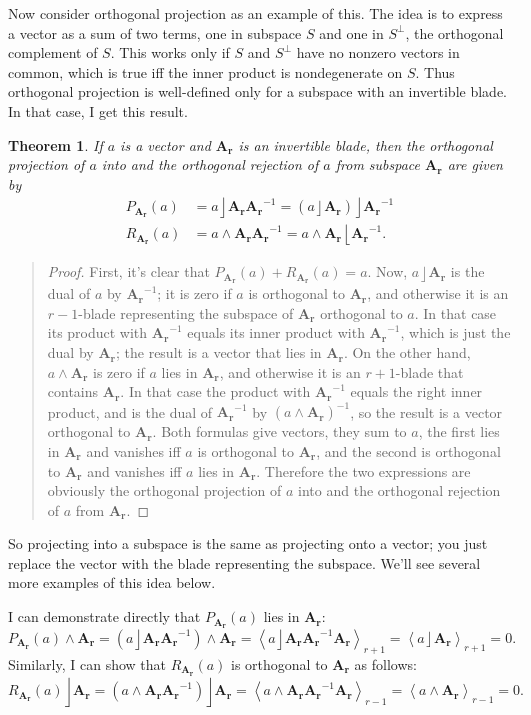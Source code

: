 \documentclass{utarticle}
\newcommand{\bl}[1]{\ensuremath{\bm{#1}}}
\DeclareMathOperator{\lin}{\rfloor}
\DeclareMathOperator{\rin}{\lfloor}
\DeclareMathOperator{\out}{\wedge}
\newcommand{\grade}[2][]{\ensuremath{\left\langle #2 \right\rangle_{#1}}}
\newtheorem{thm}{Theorem}
\newcommand{\bp}{\begin{quotation} \begin{proof}}
\newcommand{\ep}{\end{proof} \end{quotation}}
\begin{document}
Now consider orthogonal projection as an example of this.  The idea is
to express a vector as a sum of two terms, one in subspace $S$ and one
in $S^\perp$, the orthogonal complement of $S$.  This works only if
$S$ and $S^\perp$ have no nonzero vectors in common, which is true iff
the inner product is nondegenerate on $S$.  Thus orthogonal projection
is well-defined only for a subspace with an invertible
blade.  In that case, I get this result.
\begin{thm}
If $a$ is a vector and \bl{A_r} is an invertible blade, then the orthogonal projection 
of $a$ into and the orthogonal rejection of $a$ from subspace \bl{A_r} are given
by
\begin{align} 
P_{\bl{A_r}}(a) & = a \lin \bl{A_r} \bl{A_r}^{-1} = (a \lin \bl{A_r}) \lin \bl{A_r}^{-1} \nonumber \\
R_{\bl{A_r}}(a) & = a \out \bl{A_r} \bl{A_r}^{-1} = a \out \bl{A_r} \rin \bl{A_r}^{-1}.
\end{align}
\label{vectorprojrej}
\end{thm}
\bp
First, it's clear that $P_{\bl{A_r}}(a) + R_{\bl{A_r}}(a) = a$.  Now, 
$a \lin \bl{A_r}$ is the dual of $a$ by $\bl{A_r}^{-1}$; it is zero 
if $a$ is orthogonal to \bl{A_r}, and otherwise it is an $r-1$-blade 
representing the subspace of \bl{A_r} orthogonal to $a$.  In that case 
its product with $\bl{A_r}^{-1}$ equals its inner product with $\bl{A_r}^{-1}$, 
which is just the dual by \bl{A_r}; the result is a vector that lies 
in \bl{A_r}.   On the other hand, $a \out \bl{A_r}$ is 
zero if $a$ lies in \bl{A_r}, and otherwise it is an $r+1$-blade 
that contains \bl{A_r}.  In that case the product with $\bl{A_r}^{-1}$ 
equals the right inner product, and is the dual of $\bl{A_r}^{-1}$ by $(a \out \bl{A_r})^{-1}$, 
so the result is a vector orthogonal to \bl{A_r}.  Both formulas give vectors, 
they sum to $a$, the first lies in \bl{A_r} and vanishes iff $a$ is orthogonal to \bl{A_r}, 
and the second is orthogonal to \bl{A_r} and vanishes iff $a$ lies in \bl{A_r}.
Therefore the two expressions are obviously the 
orthogonal projection of $a$ into and the orthogonal rejection of $a$ 
from \bl{A_r}.
\ep

So projecting into a subspace is the same as projecting onto a vector; you just replace 
the vector with the blade representing the subspace.  We'll see several more examples 
of this idea below.

I can demonstrate directly that $P_{\bl{A_r}}(a)$ lies in \bl{A_r}:
\begin{equation}
P_{\bl{A_r}}(a) \out \bl{A_r} = (a \lin \bl{A_r} \bl{A_r}^{-1}) \out \bl{A_r} = 
\grade[r+1]{a \lin \bl{A_r} \bl{A_r}^{-1} \bl{A_r}} =  \grade[r+1]{a \lin \bl{A_r}} = 0.
\end{equation}
Similarly, I can show that $R_{\bl{A_r}}(a)$ is orthogonal to \bl{A_r} as follows:
\begin{equation}
R_{\bl{A_r}}(a) \lin \bl{A_r} = (a \out \bl{A_r} \bl{A_r}^{-1}) \lin \bl{A_r}  =
\grade[r-1]{a \out \bl{A_r} \bl{A_r}^{-1} \bl{A_r}} = \grade[r-1]{a \out \bl{A_r}} = 0.
\end{equation}
\end{document}
